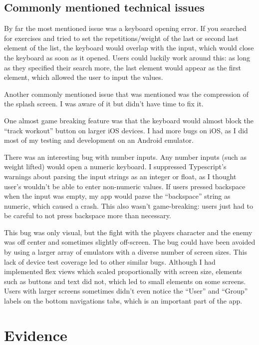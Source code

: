 \documentclass{l4proj}
\begin{document}
\section{Commonly mentioned technical issues}
By far the most mentioned issue was a keyboard opening error. If you searched for exercises and tried to set the repetitions/weight of the last or second last element of the list, the keyboard would overlap with the input, which would close the keyboard as soon as it opened. Users could luckily work around this: as long as they specified their search more, the last element would appear as the first element, which allowed the user to input the values.

Another commonly mentioned issue that was mentioned was the compression of the splash screen. I was aware of it but didn't have time to fix it. 

One almost game breaking feature was that the keyboard would almost block the ``track workout'' button on larger iOS devices. I had more bugs on iOS, as I did most of my testing and development on an Android emulator.

There was an interesting bug with number inputs. Any number inputs (such as weight lifted) would open a numeric keyboard. I suppressed Typescript's warnings about parsing the input strings as an integer or float, as I thought user's wouldn't be able to enter non-numeric values. If users pressed backspace when the input was empty, my app would parse the ``backspace'' string as numeric, which caused a crash. This also wasn't game-breaking: users just had to be careful to not press backspace more than necessary.

This bug was only visual, but the fight with the players character and the enemy was off center and sometimes slightly off-screen. The bug could have been avoided by using a larger array of emulators with a diverse number of screen sizes. This lack of device test coverage led to other similar bugs. Although I had implemented flex views which scaled proportionally with screen size, elements such as buttons and text did not, which led to small elements on some screens. Users with larger screens sometimes didn't even notice the ``User'' and ``Group'' labels on the bottom navigations tabs, which is an important part of the app.


\chapter{Evidence}
\end{document}

